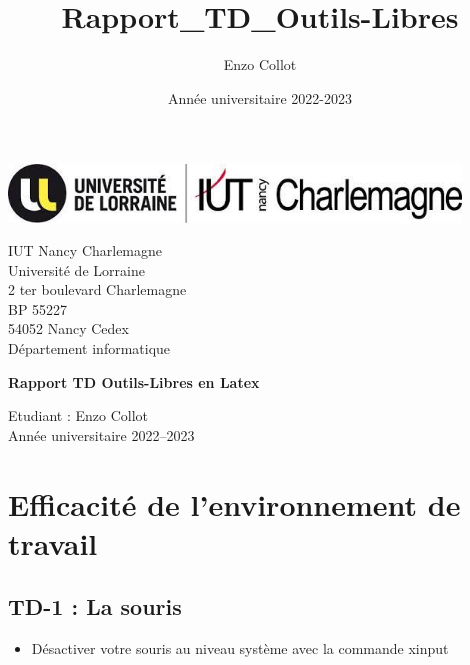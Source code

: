 \documentclass[12pt]{article}
\title{Rapport_TD_Outils-Libres}
\author{Enzo Collot}
\date{Année universitaire 2022-2023}
\begin{document}
    \thispagestyle{empty}
    \begin{center}
        \includegraphics[width=12cm]{Image-TD-1/logo_iut.jpg}
        \end{center}

\vspace{1cm}

\noindent
{\large
  IUT Nancy Charlemagne\\
  Université de Lorraine\\
  2 ter boulevard Charlemagne\\
  BP 55227\\
  54052 Nancy Cedex\\[5mm]
  Département informatique
}

\vspace{5cm}

\begin{center}
    {\huge
      \textbf{Rapport TD Outils-Libres en Latex}
    }
\end{center}

\vspace{5cm}

\vfill


{\Large
  \noindent
  Etudiant : Enzo Collot\\
  Année universitaire 2022--2023
}

\newpage
\thispagestyle{empty}
\mbox{}
\newpage

\newpage
\tableofcontents

\newpage

\section{Efficacité de l'environnement de travail}

  \subsection{TD-1 : La souris}

\begin{itemize}
  \item Désactiver votre souris au niveau système avec la commande xinput
\end{itemize}
\end{document}
